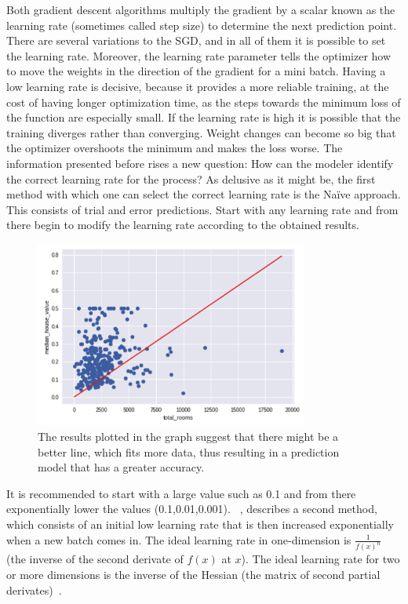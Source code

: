 Both gradient descent algorithms multiply the gradient by a scalar known as the learning rate 
(sometimes called step size) to determine the next prediction point. There are several variations to 
the \ac{SGD}, and in all of them it is possible to set the learning rate.  Moreover, the learning rate 
parameter tells the optimizer how to move the weights in the direction of the gradient for a mini batch. 
Having a low learning rate is decisive, because it provides a more reliable training, at the cost of 
having longer optimization time, as the steps towards the minimum loss of the function are especially 
small. If the learning rate is high it is possible that the training diverges rather than converging. 
Weight changes can become so big that the optimizer overshoots the minimum and makes the loss 
worse. The information presented before rises a new question: How can the modeler identify the 
correct learning rate for the process? 
As delusive as it might be, the first method with which one can select the correct learning rate is the 
Na\"ive approach. This consists of trial and error predictions. Start with any learning rate and from 
there begin to modify the learning rate according to the obtained results. 

\begin{figure}[htbp]
  \centering
  \includegraphics[width=0.8\textwidth]{images/linearGraph}
  \caption{ The results plotted in the graph suggest that there might be a better line, which fits more data, thus resulting in a prediction model that has a greater accuracy.}
  \label{fig:linearGraph}
\end{figure}

It is recommended to start with a large value such as 0.1 and from there exponentially lower the 
values (0.1,0.01,0.001).
~\citet{leslie15}, describes a second method, which consists of an initial low learning rate that is then 
increased exponentially when a new batch comes in.
The ideal learning rate in one-dimension is $\frac{1}{f(x)^n}$ (the inverse of the second derivate of 
$f(x)$ at $x$). The ideal learning rate for two or more dimensions is the inverse of the Hessian (the 
matrix of second partial derivates)~\cite{leslie15}.


